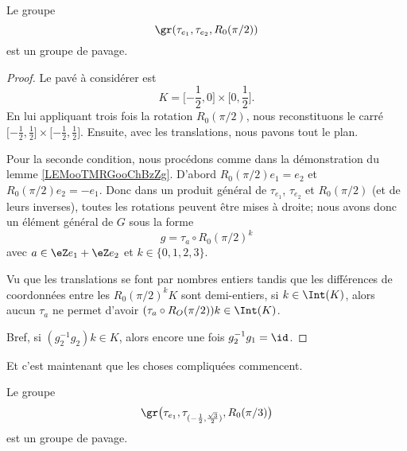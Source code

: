 \newcommand{\CaptionFigATJSooefYkmCbP}{Le compact \( K\) et son image par \( R_0(\pi)\) pour le lemme \ref{LEMooTMRGooChBzZg}.}


\begin{lemma}         \label{LEMooJPNDooHDCLnY}
    Le groupe
    \begin{equation}
        \gr(\tau_{e_1}, \tau_{e_2}, R_0(\pi/2))
    \end{equation}
    est un groupe de pavage.
\end{lemma}

\begin{proof}
    Le pavé à considérer est
    \begin{equation}
        K=\mathopen[ -\frac{ 1 }{2} , 0 \mathclose]\times \mathopen[ 0 , \frac{ 1 }{2} \mathclose].
    \end{equation}
    En lui appliquant trois fois la rotation \( R_0(\pi/2)\), nous reconstituons le carré \( \mathopen[ -\frac{ 1 }{2} , \frac{ 1 }{2} \mathclose]\times \mathopen[ -\frac{ 1 }{2} , \frac{ 1 }{2} \mathclose]\). Ensuite, avec les translations, nous pavons tout le plan.

    Pour la seconde condition, nous procédons comme dans la démonstration du lemme \ref{LEMooTMRGooChBzZg}. D'abord \( R_0(\pi/2)e_1=e_2\) et \( R_0(\pi/2)e_2=-e_1\). Donc dans un produit général de \( \tau_{e_1}\), \( \tau_{e_2}\) et \( R_0(\pi/2)\) (et de leurs inverses), toutes les rotations peuvent être mises à droite; nous avons donc un élément général de \( G\) sous la forme
    \begin{equation}
        g=\tau_a\circ R_0(\pi/2)^k
    \end{equation}
    avec \( a\in \eZ e_1+\eZ e_2\) et \( k\in \{ 0,1,2,3 \}\).
    
    Vu que les translations se font par nombres entiers tandis que les différences de coordonnées entre les \( R_0(\pi/2)^kK\) sont demi-entiers, si \( k\in \Int(K)\), alors aucun \( \tau_a\) ne permet d'avoir \( (\tau_a\circ R_O(\pi/2))k\in \Int(K)\).

    Bref, si \( (g_2^{-1}g_2)k\in K\), alors encore une fois \( g_2^{-1}g_1=\id\).
\end{proof}

Et c'est maintenant que les choses compliquées commencent.

\begin{lemma}       \label{LEMooMWWEooEbZXtb}
    Le groupe
    \begin{equation}
        \gr\big( \tau_{e_1},\tau_{(-\frac{ 1 }{2},\frac{ \sqrt{ 3 } }{2})},R_0(\pi/3) \big)
    \end{equation}
    est un groupe de pavage.
\end{lemma}

